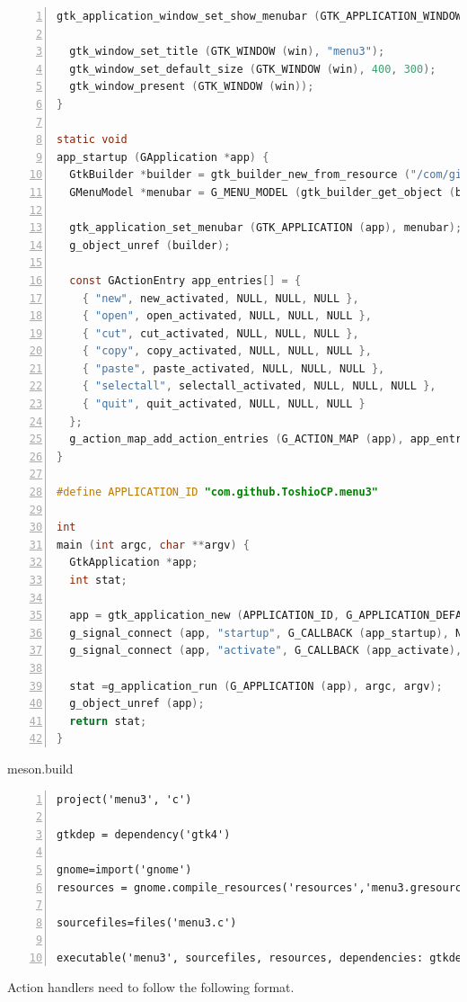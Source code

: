 \begin{lstlisting}[language=C, numbers=left]
  gtk_application_window_set_show_menubar (GTK_APPLICATION_WINDOW (win), TRUE);

  gtk_window_set_title (GTK_WINDOW (win), "menu3");
  gtk_window_set_default_size (GTK_WINDOW (win), 400, 300);
  gtk_window_present (GTK_WINDOW (win));
}

static void
app_startup (GApplication *app) {
  GtkBuilder *builder = gtk_builder_new_from_resource ("/com/github/ToshioCP/menu3/menu3.ui");
  GMenuModel *menubar = G_MENU_MODEL (gtk_builder_get_object (builder, "menubar"));

  gtk_application_set_menubar (GTK_APPLICATION (app), menubar);
  g_object_unref (builder);

  const GActionEntry app_entries[] = {
    { "new", new_activated, NULL, NULL, NULL },
    { "open", open_activated, NULL, NULL, NULL },
    { "cut", cut_activated, NULL, NULL, NULL },
    { "copy", copy_activated, NULL, NULL, NULL },
    { "paste", paste_activated, NULL, NULL, NULL },
    { "selectall", selectall_activated, NULL, NULL, NULL },
    { "quit", quit_activated, NULL, NULL, NULL }
  };
  g_action_map_add_action_entries (G_ACTION_MAP (app), app_entries, G_N_ELEMENTS (app_entries), app);
}

#define APPLICATION_ID "com.github.ToshioCP.menu3"

int
main (int argc, char **argv) {
  GtkApplication *app;
  int stat;

  app = gtk_application_new (APPLICATION_ID, G_APPLICATION_DEFAULT_FLAGS);
  g_signal_connect (app, "startup", G_CALLBACK (app_startup), NULL);
  g_signal_connect (app, "activate", G_CALLBACK (app_activate), NULL);

  stat =g_application_run (G_APPLICATION (app), argc, argv);
  g_object_unref (app);
  return stat;
}
\end{lstlisting}

meson.build

\begin{lstlisting}[numbers=left]
project('menu3', 'c')

gtkdep = dependency('gtk4')

gnome=import('gnome')
resources = gnome.compile_resources('resources','menu3.gresource.xml')

sourcefiles=files('menu3.c')

executable('menu3', sourcefiles, resources, dependencies: gtkdep)
\end{lstlisting}

Action handlers need to follow the following format.

